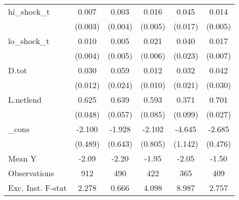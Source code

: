 {\begin{tabular}{l*{5}{c}}
\addlinespace
hi\_shock\_t  &       0.007\sym{**} &       0.003         &       0.016\sym{***}&       0.045\sym{**} &       0.014\sym{**} \\
            &     (0.003)         &     (0.004)         &     (0.005)         &     (0.017)         &     (0.005)         \\
\addlinespace
lo\_shock\_t  &       0.010\sym{**} &       0.005         &       0.021\sym{***}&       0.040\sym{*}  &       0.017\sym{**} \\
            &     (0.004)         &     (0.005)         &     (0.006)         &     (0.023)         &     (0.007)         \\
\addlinespace
D.tot       &       0.030\sym{**} &       0.059\sym{**} &       0.012         &       0.032         &       0.042         \\
            &     (0.012)         &     (0.024)         &     (0.010)         &     (0.021)         &     (0.030)         \\
\addlinespace
L.netlend   &       0.625\sym{***}&       0.639\sym{***}&       0.593\sym{***}&       0.371\sym{***}&       0.701\sym{***}\\
            &     (0.048)         &     (0.057)         &     (0.085)         &     (0.099)         &     (0.027)         \\
\addlinespace
\_cons      &      -2.100\sym{***}&      -1.928\sym{***}&      -2.102\sym{**} &      -4.645\sym{***}&      -2.685\sym{***}\\
            &     (0.489)         &     (0.643)         &     (0.805)         &     (1.142)         &     (0.476)         \\
\midrule
Mean Y      &       -2.09         &       -2.20         &       -1.95         &       -2.05         &       -1.50         \\
Observations&         912         &         490         &         422         &         365         &         409         \\
Exc. Inst. F-stat&       2.278         &       0.666         &       4.098         &       8.987         &       2.757         \\
\bottomrule
\end{tabular}
}

